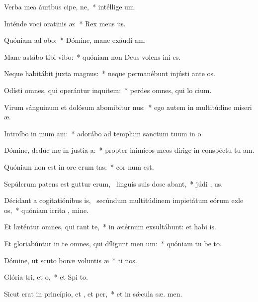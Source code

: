 \item Verba mea áuribus cipe, ne,~* intéllige  um.
\item Inténde voci oratinis æ:~* Rex meus   us.
\item Quóniam ad  obo:~* Dómine, mane exáudi  am.
\item Mane astábo tibi  vibo:~* quóniam non Deus volens ini  es.
\item Neque habitábit juxta  magnus:~* neque permanébunt injústi ante  os.
\item Odísti omnes, qui operántur inquitem:~* perdes omnes, qui lo cium.
\item Virum sánguinum et dolósum abomibitur nus:~* ego autem in multitúdine miseri æ.
\item Introíbo in mum am:~* adorábo ad templum sanctum tuum in  o.
\item Dómine, deduc me in justia a:~* propter inimícos meos dírige in conspéctu tu  am.
\item Quóniam non est in ore erum tas:~* cor  num est.
\item Sepúlcrum patens est guttur erum,~\pscross{} linguis suis dose abant,~* júdi , us.
\item Décidant a cogitatiónibus is,~\pscross{} secúndum multitúdinem impietátum eórum exle os,~* quóniam irrita , mine.
\item Et læténtur omnes, qui rant  te,~* in ætérnum exsultábunt: et habi  is.
\item Et gloriabúntur in te omnes, qui díligunt men um:~* quóniam tu be to.
\item Dómine, ut scuto bonæ voluntis æ~* ti nos.
\item Glória tri, et o,~* et Spi to.
\item Sicut erat in princípio, et , et per,~* et in sǽcula sæ. men.
